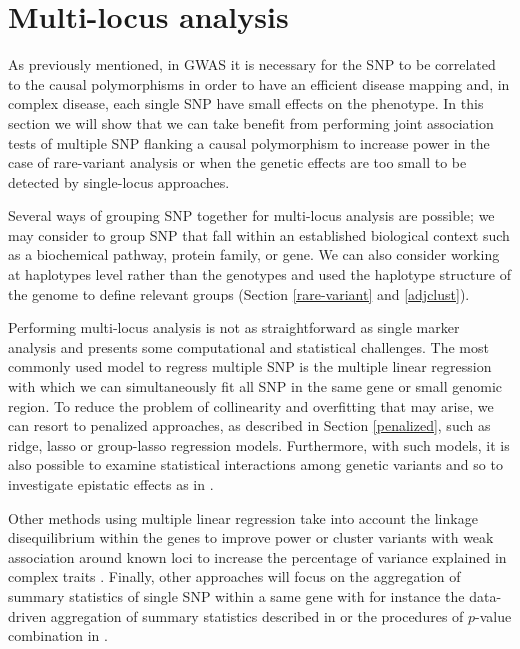 \documentclass[]{book}
\begin{document}
\hypertarget{multiloc}{%
\section{Multi-locus analysis}\label{multiloc}}

As previously mentioned, in GWAS it is necessary for the SNP to be
correlated to the causal polymorphisms in order to have an efficient
disease mapping and, in complex disease, each single SNP have small
effects on the phenotype. In this section we will show that we can take
benefit from performing joint association tests of multiple SNP flanking
a causal polymorphism to increase power in the case of rare-variant
analysis or when the genetic effects are too small to be detected by
single-locus approaches.

Several ways of grouping SNP together for multi-locus analysis are
possible; we may consider to group SNP that fall within an established
biological context such as a biochemical pathway, protein family, or
gene. We can also consider working at haplotypes level rather than the
genotypes and used the haplotype structure of the genome to define
relevant groups (Section \ref{rare-variant} and \ref{adjclust}).

Performing multi-locus analysis is not as straightforward as single
marker analysis and presents some computational and statistical
challenges. The most commonly used model to regress multiple SNP is the
multiple linear regression with which we can simultaneously fit all SNP
in the same gene or small genomic region. To reduce the problem of
collinearity and overfitting that may arise, we can resort to penalized
approaches, as described in Section \ref{penalized}, such as ridge,
lasso or group-lasso regression models. Furthermore, with such models,
it is also possible to examine statistical interactions among genetic
variants and so to investigate epistatic effects as in
\citep{stanislas_eigen-epistasis_2016}.

Other methods using multiple linear regression take into account the
linkage disequilibrium within the genes to improve power
\citep{yoo_multiple_2016} or cluster variants with weak association around
known loci to increase the percentage of variance explained in complex
traits \citep{pare_contribution_2015}. Finally, other approaches will focus
on the aggregation of summary statistics of single SNP within a same
gene with for instance the data-driven aggregation of summary statistics
described in \citep{kwak_adaptive_2016} or the procedures of \(p\)-value
combination in \citep{petersen_assessing_2013}.
\end{document}
